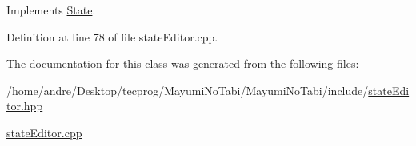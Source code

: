 Implements \hyperlink{class_state_a6445efe57dd006dec3d5041272d4688c}{State}.



Definition at line 78 of file state\-Editor.\-cpp.



The documentation for this class was generated from the following files\-:\begin{DoxyCompactItemize}
\item 
/home/andre/\-Desktop/tecprog/\-Mayumi\-No\-Tabi/\-Mayumi\-No\-Tabi/include/\hyperlink{state_editor_8hpp}{state\-Editor.\-hpp}\item 
\hyperlink{state_editor_8cpp}{state\-Editor.\-cpp}\end{DoxyCompactItemize}
